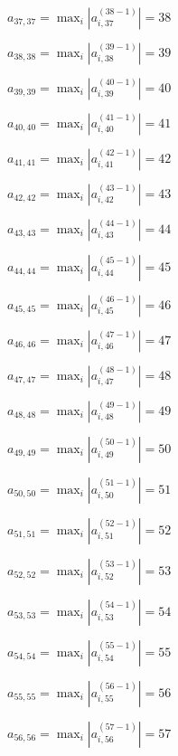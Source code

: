 \documentclass[a4paper,12pt]{article}
\begin{document}
$a _{ 37, 37 } =  \max _i |a _{ i, 37 } ^{ (38 - 1) } | = 38$

$a _{ 38, 38 } =  \max _i |a _{ i, 38 } ^{ (39 - 1) } | = 39$

$a _{ 39, 39 } =  \max _i |a _{ i, 39 } ^{ (40 - 1) } | = 40$

$a _{ 40, 40 } =  \max _i |a _{ i, 40 } ^{ (41 - 1) } | = 41$

$a _{ 41, 41 } =  \max _i |a _{ i, 41 } ^{ (42 - 1) } | = 42$

$a _{ 42, 42 } =  \max _i |a _{ i, 42 } ^{ (43 - 1) } | = 43$

$a _{ 43, 43 } =  \max _i |a _{ i, 43 } ^{ (44 - 1) } | = 44$

$a _{ 44, 44 } =  \max _i |a _{ i, 44 } ^{ (45 - 1) } | = 45$

$a _{ 45, 45 } =  \max _i |a _{ i, 45 } ^{ (46 - 1) } | = 46$

$a _{ 46, 46 } =  \max _i |a _{ i, 46 } ^{ (47 - 1) } | = 47$

$a _{ 47, 47 } =  \max _i |a _{ i, 47 } ^{ (48 - 1) } | = 48$

$a _{ 48, 48 } =  \max _i |a _{ i, 48 } ^{ (49 - 1) } | = 49$

$a _{ 49, 49 } =  \max _i |a _{ i, 49 } ^{ (50 - 1) } | = 50$

$a _{ 50, 50 } =  \max _i |a _{ i, 50 } ^{ (51 - 1) } | = 51$

$a _{ 51, 51 } =  \max _i |a _{ i, 51 } ^{ (52 - 1) } | = 52$

$a _{ 52, 52 } =  \max _i |a _{ i, 52 } ^{ (53 - 1) } | = 53$

$a _{ 53, 53 } =  \max _i |a _{ i, 53 } ^{ (54 - 1) } | = 54$

$a _{ 54, 54 } =  \max _i |a _{ i, 54 } ^{ (55 - 1) } | = 55$

$a _{ 55, 55 } =  \max _i |a _{ i, 55 } ^{ (56 - 1) } | = 56$

$a _{ 56, 56 } =  \max _i |a _{ i, 56 } ^{ (57 - 1) } | = 57$
\end{document}
